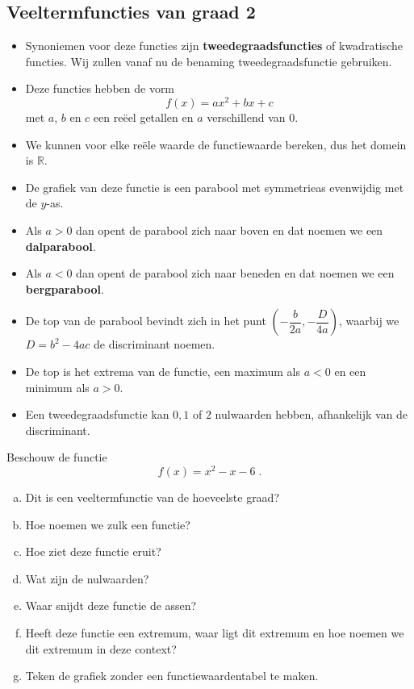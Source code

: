 \documentclass[12pt]{article}
\begin{document}
\subsection{Veeltermfuncties van graad 2}

\begin{itemize}
  \item Synoniemen voor deze functies zijn {\bf tweedegraadsfuncties} of kwadratische functies. Wij zullen vanaf nu de benaming tweedegraadsfunctie gebruiken.
  \item Deze functies hebben de vorm
  $$f(x) = ax^2+bx+c $$
  met $a$, $b$ en $c$ een reëel getallen en $a$ verschillend van $0$.
  \item We kunnen voor elke reële waarde de functiewaarde bereken, dus het domein is $\mathbb{R}$.
  \item De grafiek van deze functie is een parabool met symmetrieas evenwijdig met de $y$-as.
  \item Als $a>0$ dan opent de parabool zich naar boven en dat noemen we een {\bf dalparabool}.
  \item Als $a<0$ dan opent de parabool zich naar beneden en dat noemen we een {\bf bergparabool}.
  \item De top van de parabool bevindt zich in het punt $(-\dfrac{b}{2a}, -\dfrac{D}{4a})$, waarbij we $D=b^2-4ac$ de discriminant noemen.
  \item De top is het extrema van de functie, een maximum als $a<0$ en een minimum als $a>0$.
  \item Een tweedegraadsfunctie kan $0, 1$ of $2$ nulwaarden hebben, afhankelijk van de discriminant.
\end{itemize}

\begin{oefening}
Beschouw de functie 
$$f(x)=x^2-x-6\;.$$
\begin{enumerate}[(a)]
  \item Dit is een veeltermfunctie van de hoeveelste graad?
  \item Hoe noemen we zulk een functie?
  \item Hoe ziet deze functie eruit?
  \item Wat zijn de nulwaarden?
  \item Waar snijdt deze functie de assen?
  \item Heeft deze functie een extremum, waar ligt dit extremum en hoe noemen we dit extremum in deze context?
  \item Teken de grafiek zonder een functiewaardentabel te maken.
\end{enumerate}
\end{oefening}
\end{document}
